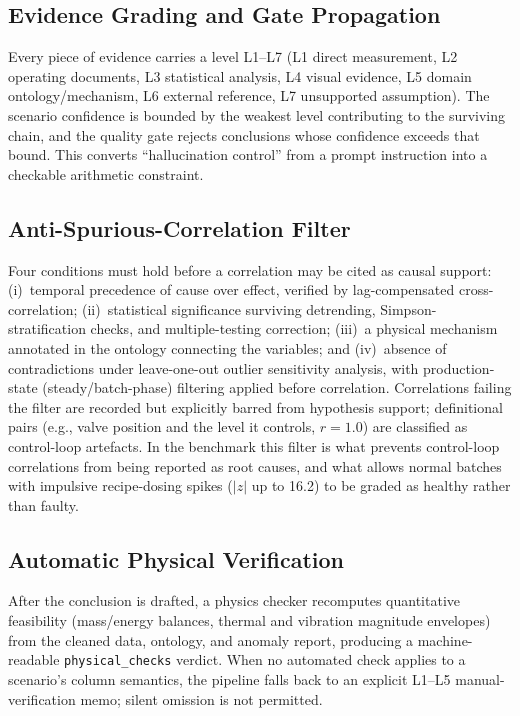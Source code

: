 \documentclass[journal]{IEEEtran}
\begin{document}
\subsection{Evidence Grading and Gate Propagation}
Every piece of evidence carries a level L1--L7 (L1 direct measurement, L2 operating documents, L3 statistical analysis, L4 visual evidence, L5 domain ontology/mechanism, L6 external reference, L7 unsupported assumption). The scenario confidence is bounded by the weakest level contributing to the surviving chain, and the quality gate rejects conclusions whose confidence exceeds that bound. This converts ``hallucination control'' from a prompt instruction into a checkable arithmetic constraint.

\subsection{Anti-Spurious-Correlation Filter}
Four conditions must hold before a correlation may be cited as causal support: (i)~temporal precedence of cause over effect, verified by lag-compensated cross-correlation; (ii)~statistical significance surviving detrending, Simpson-stratification checks, and multiple-testing correction; (iii)~a physical mechanism annotated in the ontology connecting the variables; and (iv)~absence of contradictions under leave-one-out outlier sensitivity analysis, with production-state (steady/batch-phase) filtering applied before correlation. Correlations failing the filter are recorded but explicitly barred from hypothesis support; definitional pairs (e.g., valve position and the level it controls, $r\!=\!1.0$) are classified as control-loop artefacts. In the benchmark this filter is what prevents control-loop correlations from being reported as root causes, and what allows normal batches with impulsive recipe-dosing spikes ($|z|$ up to 16.2) to be graded as healthy rather than faulty.

\subsection{Automatic Physical Verification}
After the conclusion is drafted, a physics checker recomputes quantitative feasibility (mass/energy balances, thermal and vibration magnitude envelopes) from the cleaned data, ontology, and anomaly report, producing a machine-readable \texttt{physical\_checks} verdict. When no automated check applies to a scenario's column semantics, the pipeline falls back to an explicit L1--L5 manual-verification memo; silent omission is not permitted.
\end{document}
